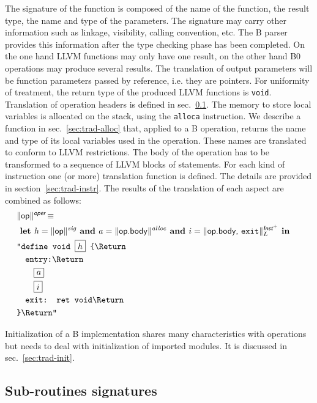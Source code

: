 \documentclass{llncs}
\newcommand{\trad}[2]{\ensuremath{\lVert \textsf{#1} \rVert^{\textit{#2}}}}
\newcommand{\nl}[0]{\text{\Return}}
\DeclareMathOperator{\isdef}{\equiv}
\newcommand{\llvm}[1]{\texttt{#1}}
\newcommand{\B}[1]{\textsf{#1}}
\newcommand{\ListOf}[1]{$\mbox{#1}^+$}
\newcommand{\LET}[0]{\textbf{ let }}
\newcommand{\IN}[0]{\textbf{ in }}
\newcommand{\AND}[0]{\textbf{ and }}
\newcommand{\PH}[1]{\framebox{$#1$}}
\begin{document}
The signature of the function is composed of the name of the function, the
result type, the name and type of the parameters. The signature may carry other
information such as linkage, visibility, calling convention, etc. The B parser
provides this information after the type checking phase has been completed.  On
the one hand LLVM functions may only have one result, on the other hand B0
operations may produce several results. The translation of output parameters
will be function parameters passed by reference, i.e. they are pointers. For
uniformity of treatment, the return type of the produced LLVM functions is
\llvm{void}. Translation of operation headers is defined in
sec.~\ref{sec:trad-header}. The memory to store local variables is allocated on
the stack, using the \llvm{alloca} instruction. We describe a function in
sec.~\ref{sec:trad-alloc} that, applied to a B operation, returns the name and
type of its local variables used in the operation. These names are translated to
conform to LLVM restrictions. The body of the operation has to be transformed to
a sequence of LLVM blocks of statements. For each kind of instruction one (or
more) translation function is defined. The details are provided in
section~\ref{sec:trad-instr}.  The results of the translation of each aspect are
combined as follows:
\begin{align*}
\begin{split}
  \lefteqn{\trad{\B{op}}{\B{oper}} \isdef} \\
  & \LET h = \trad{\B{op}}{sig} \AND   a = \trad{\B{op.body}}{alloc} \AND i = \trad{\B{op.body}, \llvm{exit}}{\ListOf{\B{Inst}}}_L \IN  \\
  & \llvm{"define void \PH{h} \{\nl} \\
  & \quad \llvm{entry:\nl} \\
  & \quad \quad \PH{a} \\
  & \quad \quad \PH{i} \\
  & \quad \llvm{exit: ret void\nl} \\
  & \llvm{\}\nl"}
\end{split}
\end{align*}

Initialization of a B implementation shares many characteristics with operations
but needs to deal with initialization of imported modules. It is discussed in
sec.~\ref{sec:trad-init}.

\subsection{Sub-routines signatures}
\label{sec:trad-header}
\end{document}
